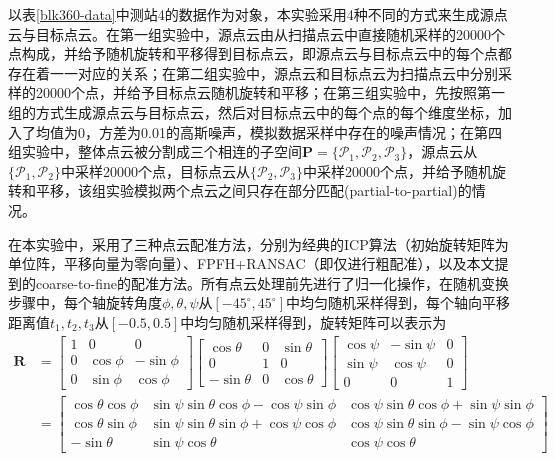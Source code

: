 以表\ref{blk360-data}中测站4的数据作为对象，本实验采用4种不同的方式来生成源点云与目标点云。在第一组实验中，源点云由从扫描点云中直接随机采样的20000个点构成，并给予随机旋转和平移得到目标点云，即源点云与目标点云中的每个点都存在着一一对应的关系；在第二组实验中，源点云和目标点云为扫描点云中分别采样的20000个点，并给予目标点云随机旋转和平移；在第三组实验中，先按照第一组的方式生成源点云与目标点云，然后对目标点云中的每个点的每个维度坐标，加入了均值为0，方差为0.01的高斯噪声，模拟数据采样中存在的噪声情况；在第四组实验中，整体点云被分割成三个相连的子空间$\boldsymbol{P} = \{\mathcal{P}_1, \mathcal{P}_2, \mathcal{P}_3\}$，源点云从$\{\mathcal{P}_1, \mathcal{P}_2\}$中采样20000个点，目标点云从$\{\mathcal{P}_2, \mathcal{P}_3\}$中采样20000个点，并给予随机旋转和平移，该组实验模拟两个点云之间只存在部分匹配(partial-to-partial)的情况。

在本实验中，采用了三种点云配准方法，分别为经典的ICP算法（初始旋转矩阵为单位阵，平移向量为零向量）、FPFH+RANSAC（即仅进行粗配准），以及本文提到的coarse-to-fine的配准方法。所有点云处理前先进行了归一化操作，在随机变换步骤中，每个轴旋转角度$\phi, \theta, \psi$从$[-45^\circ, 45^\circ]$中均匀随机采样得到，每个轴向平移距离值$t_1, t_2, t_3$从$[-0.5, 0.5]$中均匀随机采样得到，旋转矩阵可以表示为
\begin{align}
	\boldsymbol{R} & = 
	\begin{bmatrix}
		1 & 0 & 0 \\
		0 & \cos\phi & -\sin\phi\\
		0 & \sin\phi & \cos\phi
	\end{bmatrix}
	\begin{bmatrix}
		\cos\theta & 0 & \sin\theta\\
		0 & 1 & 0 \\
		-\sin\theta & 0 & \cos\theta
	\end{bmatrix}
	\begin{bmatrix}
		\cos\psi & -\sin\psi & 0\\
		\sin\psi & \cos\psi & 0 \\
		0 & 0 & 1
	\end{bmatrix}\\
	 & = 
 	\begin{bmatrix}
 		\cos\theta\cos\phi &  \sin\psi\sin\theta\cos\phi-\cos\psi\sin\phi & \cos\psi\sin\theta\cos\phi+\sin\psi\sin\phi \\
 		\cos\theta\sin\phi & \sin\psi\sin\theta\sin\phi+\cos\psi\cos\phi & \cos\psi\sin\theta\sin\phi-\sin\psi\cos\phi \\
 		-\sin\theta & \sin\psi\cos\theta & \cos\psi\cos\theta
 	\end{bmatrix}
\end{align}

